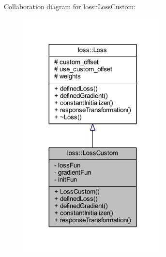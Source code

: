 Collaboration diagram for loss\+:\+:Loss\+Custom\+:\nopagebreak
\begin{figure}[H]
\begin{center}
\leavevmode
\includegraphics[width=215pt]{classloss_1_1_loss_custom__coll__graph}
\end{center}
\end{figure}
